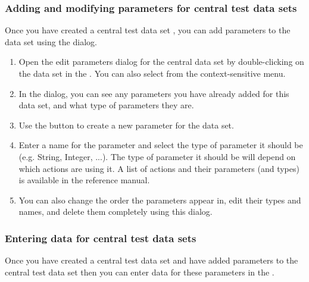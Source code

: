 \subsubsection{Adding and modifying parameters for central test data sets}
\label{TasksCentralDataEditParams}

Once you have created a central test data set , you can add parameters to the data set using the  dialog. 
\begin{enumerate}
\item Open the edit parameters dialog for the central data set by double-clicking on the data set in the \gddataeditor{}. You can also select  from the context-sensitive menu. 
\item In the  dialog, you can see any parameters you have already added for this data set, and what type of parameters they are. 
\item Use the  button to create a new parameter for the data set. 
\item Enter a name for the parameter and select the type of parameter it should be (e.g. String, Integer, ...). The type of parameter it should be will depend on which actions are using it. A list of actions and their parameters (and types) is available in the reference manual.

\item You can also change the order the parameters appear in, edit their types and names, and delete them completely using this dialog. 

\end{enumerate}


\subsubsection{Entering data for central test data sets}
\label{TasksDSVCentral}

Once you have created a central test data set  and have added parameters to the central test data set  then you can enter data for these parameters in the \gddatasetsview{}.


